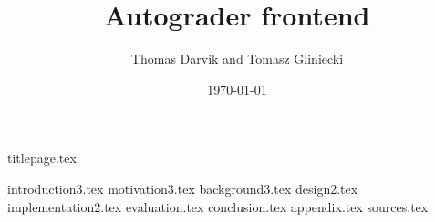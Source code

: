 \documentclass[12pt]{report}
\title{Autograder frontend}
\author{Thomas Darvik and Tomasz Gliniecki}
\date{\today}
\begin{document}

{titlepage.tex}

\tableofcontents
{}
{introduction3.tex}
{motivation3.tex}
{background3.tex}
{design2.tex}
{implementation2.tex}
{evaluation.tex}
{conclusion.tex}
{appendix.tex}
{sources.tex}
\printindex
\end{document}
